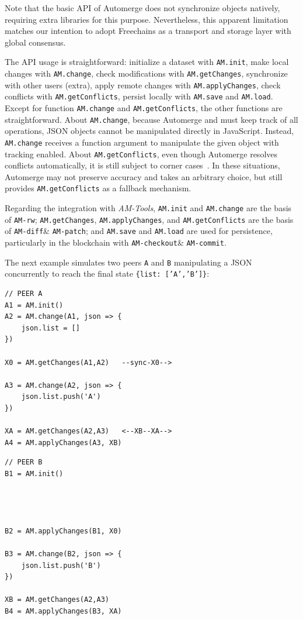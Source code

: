 \documentclass[12pt]{article}
\newcommand{\AMT}      {\emph{AM-Tools}\xspace}
\newcommand{\code}[1]  {\texttt{\footnotesize{#1}}}
\newcommand{\amrw}       {\code{AM-rw}\xspace}
\newcommand{\amdiff}     {\code{AM-diff}\xspace}
\newcommand{\ampatch}    {\code{AM-patch}\xspace}
\newcommand{\amcheckout} {\code{AM-checkout}\xspace}
\newcommand{\amcommit}   {\code{AM-commit}\xspace}
\begin{document}
Note that the basic API of Automerge does not synchronize objects natively,
requiring extra libraries for this purpose.
%
Nevertheless, this apparent limitation matches our intention to adopt
Freechains as a transport and storage layer with global consensus.

The API usage is straightforward:
    initialize a dataset with \code{AM.init},
    make local changes with \code{AM.change},
    check modifications with \code{AM.getChanges},
    synchronize with other users (extra),
    apply remote changes with \code{AM.applyChanges},
    check conflicts with \code{AM.getConflicts},
    persist locally with \code{AM.save} and \code{AM.load}.
%
Except for function \code{AM.change} and \code{AM.getConflicts}, the other
functions are straightforward.
%
About \code{AM.change}, because Automerge and must keep track of all
operations, JSON objects cannot be manipulated directly in JavaScript.
Instead, \code{AM.change} receives a function argument to manipulate
the given object with tracking enabled.
%
About \code{AM.getConflicts}, even though Automerge resolves conflicts
automatically, it is still subject to corner cases~\cite{p2p.automerge}.
In these situations, Automerge may not preserve accuracy and takes an arbitrary
choice, but still provides \code{AM.getConflicts} as a fallback mechanism.

Regarding the integration with \AMT,
    \code{AM.init} and \code{AM.change} are the basis of \amrw;
    \code{AM.getChanges}, \code{AM.applyChanges}, and \code{AM.getConflicts}
    are the basis of \amdiff \& \ampatch; and
    \code{AM.save} and \code{AM.load} are used for persistence, particularly in
    the blockchain with \amcheckout \& \amcommit.

The next example simulates two peers \code{A} and \code{B} manipulating a
JSON concurrently to reach the final state \code{\{list:~['A','B']\}}:

\noindent
{\footnotesize
\begin{minipage}[t]{0.6\textwidth}
\begin{verbatim}
// PEER A
A1 = AM.init()
A2 = AM.change(A1, json => {
    json.list = []
})

X0 = AM.getChanges(A1,A2)   --sync-X0-->

A3 = AM.change(A2, json => {
    json.list.push('A')
})

XA = AM.getChanges(A2,A3)   <--XB--XA-->
A4 = AM.applyChanges(A3, XB)
\end{verbatim}
\end{minipage}
\begin{minipage}[t]{0.4\textwidth}
\begin{verbatim}
// PEER B
B1 = AM.init()




B2 = AM.applyChanges(B1, X0)

B3 = AM.change(B2, json => {
    json.list.push('B')
})

XB = AM.getChanges(A2,A3)
B4 = AM.applyChanges(B3, XA)
\end{verbatim}
\end{minipage}
}
\end{document}
